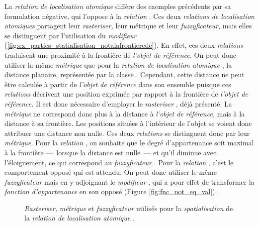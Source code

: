 La \emph{relation de localisation atomique}
 diffère des exemples
précédents par sa formulation négative, qui l'oppose à la
\emph{relation} . Ces deux
\emph{relations de localisation atomiques} partagent leur
\emph{rasteriser,} leur métrique et leur \emph{fuzzyficateur,} mais
elles se distinguent par l'utilisation du \emph{modifieur}
(\autoref{fig:ex_parties_statialisation_notalafrontierede}). En effet,
ces deux \emph{relations} traduisent une proximité à la frontière de
\emph{l'objet de référence.} On peut donc utiliser la même
\emph{métrique} que pour la \emph{relation de localisation atomique}
\protect{}, la distance
planaire, représentée par la classe . Cependant,
cette distance ne peut être calculée à partir de \emph{l'objet de
  référence} dans son ensemble puisque ces \emph{relations} décrivent
une position exprimée par rapport à la frontière de \emph{l'objet de
  référence.} Il est donc nécessaire d'employer le \emph{rasteriser}
, déjà présenté. La \emph{métrique} ne
correspond donc plus à la distance à \emph{l'objet de référence,} mais
à la distance à sa frontière. Les positions situées à l'intérieur de
l'objet se voient donc attribuer une distance non nulle. Ces deux
\emph{relations} se distinguent donc par leur \emph{métrique.} Pour la
\emph{relation} , on souhaite que
le degré d'appartenance soit maximal à la frontière ---~lorsque la
distance est nulle~--- et qu'il diminue avec l'éloignement, ce qui
correspond au \emph{fuzzyficateur} . Pour la
\emph{relation} , c'est le
comportement opposé qui est attendu. On peut donc utiliser le même
\emph{fuzzyficateur} mais en y adjoignant le \emph{modifieur}
, qui a pour effet de transformer la \emph{fonction
  d'appartenance} en son opposé (Figure \ref{fig:fnc_not_eq_val}).

\begin{figure}
  \centering  
  \caption{\emph{Rasteriser,} \emph{métrique} et \emph{fuzzyficateur}
    utilisés pour la \emph{spatialisation} de la \emph{relation de
      localisation atomique}
    \protect{}.}
  \label{fig:ex_parties_statialisation_notalafrontierede}
\end{figure}

